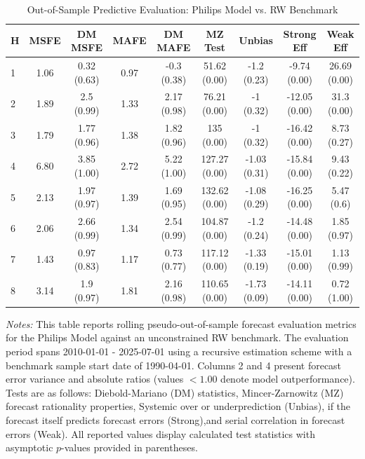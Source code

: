 \begin{table}[htbp]
\centering
\caption{Out-of-Sample Predictive Evaluation: Philips Model vs. RW Benchmark}
\label{tab:philips_model_evaluation}
\footnotesize
\begin{tabular}{l cccccccc}
\hline\hline
\rule{0pt}{3ex}
\textbf{H} & \textbf{MSFE} & \textbf{DM MSFE} & \textbf{MAFE} & \textbf{DM MAFE} & \textbf{MZ Test} & \textbf{Unbias} & \textbf{Strong Eff} & \textbf{Weak Eff} \\[0.5ex]
\hline
\rule{0pt}{2.5ex}
1 & 1.06 & 0.32 (0.63) & 0.97 & -0.3 (0.38) & 51.62 (0.00) & -1.2 (0.23) & -9.74 (0.00) & 26.69 (0.00) \\
2 & 1.89 & 2.5 (0.99) & 1.33 & 2.17 (0.98) & 76.21 (0.00) & -1 (0.32) & -12.05 (0.00) & 31.3 (0.00) \\
3 & 1.79 & 1.77 (0.96) & 1.38 & 1.82 (0.96) & 135 (0.00) & -1 (0.32) & -16.42 (0.00) & 8.73 (0.27) \\
4 & 6.80 & 3.85 (1.00) & 2.72 & 5.22 (1.00) & 127.27 (0.00) & -1.03 (0.31) & -15.84 (0.00) & 9.43 (0.22) \\
5 & 2.13 & 1.97 (0.97) & 1.39 & 1.69 (0.95) & 132.62 (0.00) & -1.08 (0.29) & -16.25 (0.00) & 5.47 (0.6) \\
6 & 2.06 & 2.66 (0.99) & 1.34 & 2.54 (0.99) & 104.87 (0.00) & -1.2 (0.24) & -14.48 (0.00) & 1.85 (0.97) \\
7 & 1.43 & 0.97 (0.83) & 1.17 & 0.73 (0.77) & 117.12 (0.00) & -1.33 (0.19) & -15.01 (0.00) & 1.13 (0.99) \\
8 & 3.14 & 1.9 (0.97) & 1.81 & 2.16 (0.98) & 110.65 (0.00) & -1.73 (0.09) & -14.11 (0.00) & 0.72 (1.00) \\
\hline\hline
\end{tabular}%
\par\smallskip
\parbox{\textwidth}{\scriptsize \textit{Notes:} This table reports rolling pseudo-out-of-sample forecast evaluation metrics for the Philips Model against an unconstrained RW benchmark. The evaluation period spans 2010-01-01 - 2025-07-01 using a recursive estimation scheme with a benchmark sample start date of 1990-04-01. Columns 2 and 4 present forecast error variance and absolute ratios (values $< 1.00$ denote model outperformance). Tests are as follows: Diebold-Mariano (DM) statistics, Mincer-Zarnowitz (MZ) forecast rationality properties, Systemic over or underprediction (Unbias), if the forecast itself predicts forecast errors (Strong),and serial correlation in forecast errors (Weak). All reported values display calculated test statistics with asymptotic $p$-values provided in parentheses.}
\end{table}
